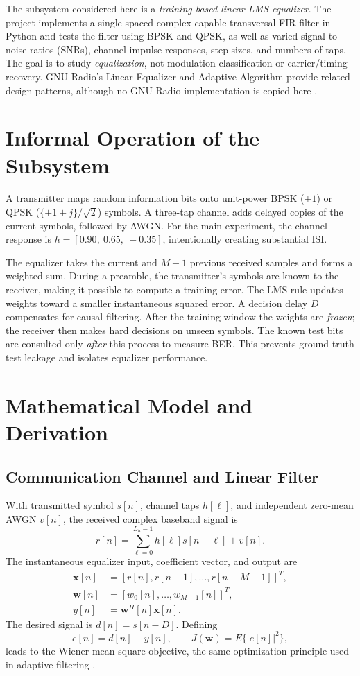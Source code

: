 \documentclass[conference,10pt]{IEEEtran}
\newcommand{\vect}[1]{\mathbf{#1}}
\begin{document}
The subsystem considered here is a \emph{training-based linear LMS equalizer}. The project implements a single-spaced complex-capable transversal FIR filter in Python and tests the filter using BPSK and QPSK, as well as varied signal-to-noise ratios (SNRs), channel impulse responses, step sizes, and numbers of taps. The goal is to study \emph{equalization}, not modulation classification or carrier/timing recovery. GNU Radio's Linear Equalizer and Adaptive Algorithm provide related design patterns, although no GNU Radio implementation is copied here \cite{gnuradioeq,gnuradioadaptive}.

\section{Informal Operation of the Subsystem}
A transmitter maps random information bits onto unit-power BPSK ($\pm 1$) or QPSK ($\{\pm1\pm j\}/\sqrt{2}$) symbols. A three-tap channel adds delayed copies of the current symbols, followed by AWGN. For the main experiment, the channel response is $h=[0.90,\ 0.65,\ -0.35]$, intentionally creating substantial ISI.

The equalizer takes the current and $M-1$ previous received samples and forms a weighted sum. During a preamble, the transmitter's symbols are known to the receiver, making it possible to compute a training error. The LMS rule updates weights toward a smaller instantaneous squared error. A decision delay $D$ compensates for causal filtering. After the training window the weights are \emph{frozen}; the receiver then makes hard decisions on unseen symbols. The known test bits are consulted only \emph{after} this process to measure BER. This prevents ground-truth test leakage and isolates equalizer performance.

\section{Mathematical Model and Derivation}
\subsection{Communication Channel and Linear Filter}
With transmitted symbol $s[n]$, channel taps $h[\ell]$, and independent zero-mean AWGN $v[n]$, the received complex baseband signal is
\begin{equation}
 r[n]=\sum_{\ell=0}^{L_h-1}h[\ell]s[n-\ell]+v[n].
 \label{eq:channel}
\end{equation}
The instantaneous equalizer input, coefficient vector, and output are
\begin{align}
 \vect{x}[n]&=[r[n],r[n-1],\ldots,r[n-M+1]]^T,\\
 \vect{w}[n]&=[w_0[n],\ldots,w_{M-1}[n]]^T,\\
 y[n]&=\vect{w}^H[n]\vect{x}[n]. \label{eq:output}
\end{align}
The desired signal is $d[n]=s[n-D]$. Defining
\begin{equation}
 e[n]=d[n]-y[n], \qquad J(\vect{w})=E\{|e[n]|^2\},
 \label{eq:err}
\end{equation}
leads to the Wiener mean-square objective, the same optimization principle used in adaptive filtering \cite{widrow1985,haykin2002}.
\end{document}
